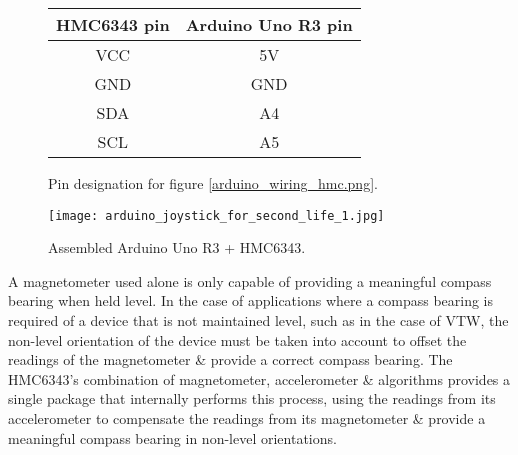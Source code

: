 
\begin{figure}[h]
\begin{center}
\begin{minipage}{.7\linewidth}
\begin{center}
\begin{tabular}{| c | c |}
\hline	
\textbf{HMC6343 pin} & \textbf{Arduino Uno R3 pin} \\
\hline
VCC & 5V\HMCvccFootnote{} \\
\hline
GND & GND \\
\hline
SDA & A4\itwocFootnote{} \\
\hline
SCL & A5 \\
\hline
\end{tabular}
\end{center}
\end{minipage}
\end{center}
\caption{Pin designation for figure \ref{arduino_wiring_hmc.png}.}
\label{HMC6343wiringtable}
\end{figure}


\begin{figure}[h]
\centering
  \texttt{[image: arduino\_joystick\_for\_second\_life\_1.jpg]}
  \caption{Assembled Arduino Uno R3 + HMC6343.}
  \label{arduino_joystick_for_second_life_1.jpg}
\end{figure}

A magnetometer used alone is only capable of providing a meaningful compass bearing when held level. In the case of applications where a compass bearing is required of a device that is not maintained level, such as in the case of VTW, the non-level orientation of the device must be taken into account to offset the readings of the magnetometer \& provide a correct compass bearing. The HMC6343's combination of magnetometer, accelerometer \& algorithms provides a single package that internally performs this process, using the readings from its accelerometer to compensate the readings from its magnetometer \& provide a meaningful compass bearing in non-level orientations.

